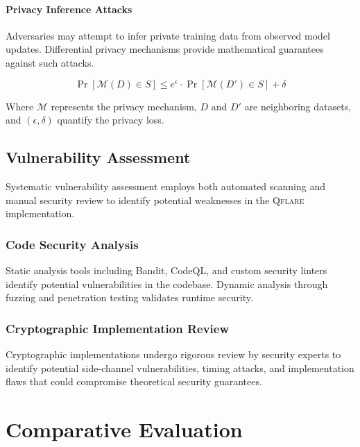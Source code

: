 \documentclass[12pt,a4paper,twoside]{book}
\newcommand{\qflare}{\textsc{Qflare}}
\begin{document}
\subsubsection{Privacy Inference Attacks}
Adversaries may attempt to infer private training data from observed model updates. Differential privacy mechanisms provide mathematical guarantees against such attacks.

\begin{equation}
\label{eq:differential-privacy}
\Pr[\mathcal{M}(D) \in S] \leq e^{\epsilon} \cdot \Pr[\mathcal{M}(D') \in S] + \delta
\end{equation}

Where $\mathcal{M}$ represents the privacy mechanism, $D$ and $D'$ are neighboring datasets, and $(\epsilon, \delta)$ quantify the privacy loss.

\section{Vulnerability Assessment}
\label{sec:vulnerability-assessment}

Systematic vulnerability assessment employs both automated scanning and manual security review to identify potential weaknesses in the \qflare{} implementation.

\subsection{Code Security Analysis}
\label{subsec:code-security}

Static analysis tools including Bandit, CodeQL, and custom security linters identify potential vulnerabilities in the codebase. Dynamic analysis through fuzzing and penetration testing validates runtime security.

\subsection{Cryptographic Implementation Review}
\label{subsec:crypto-review}

Cryptographic implementations undergo rigorous review by security experts to identify potential side-channel vulnerabilities, timing attacks, and implementation flaws that could compromise theoretical security guarantees.

\chapter{Comparative Evaluation}
\label{ch:evaluation}
\end{document}
